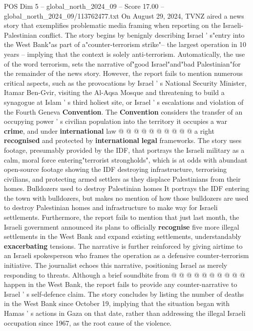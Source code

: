 \begin{textsample}{POS Dim 5 – global\_north\_2024\_09 – Score 17.00 – global\_north\_2024\_09/113762477.txt}
On August 29, 2024, TVNZ aired a news story that exemplifies problematic media framing when reporting on the Israeli-Palestinian conflict.
The story begins by benignly describing Israel ' s"entry into the West Bank"as part of a"counter-terrorism strike"-- the largest operation in 10 years -- implying that the context is solely anti-terrorism.
Automatically, the use of the word terrorism, sets the narrative of"good Israel"and"bad Palestinian"for the remainder of the news story.
However, the report fails to mention numerous critical aspects, such as the provocations by Israel ' s National Security Minister, Itamar Ben-Gvir, visiting the Al-Aqsa Mosque and threatening to build a synagogue at Islam ' s third holiest site, or Israel ' s escalations and violation of the Fourth Geneva \textbf{Convention}.
The \textbf{Convention} considers the transfer of an occupying power ' s civilian population into the territory it occupies a war \textbf{crime}, and under \textbf{international} law @ @ @ @ @ @ @ @ @ @ a right \textbf{recognised} and protected by \textbf{international} \textbf{legal} frameworks.
The story uses footage, presumably provided by the IDF, that portrays the Israeli military as a calm, moral force entering"terrorist strongholds", which is at odds with abundant open-source footage showing the IDF destroying infrastructure, terrorising civilians, and protecting armed settlers as they displace Palestinians from their homes.
Bulldozers used to destroy Palestinian homes It portrays the IDF entering the town with bulldozers, but makes no mention of how those bulldozers are used to destroy Palestinian homes and infrastructure to make way for Israeli settlements.
Furthermore, the report fails to mention that just last month, the Israeli government announced its plans to officially \textbf{recognise} five more illegal settlements in the West Bank and expand existing settlements, understandably \textbf{exacerbating} tensions.
The narrative is further reinforced by giving airtime to an Israeli spokesperson who frames the operation as a defensive counter-terrorism initiative.
The journalist echoes this narrative, positioning Israel as merely responding to threats.
Although a brief soundbite from @ @ @ @ @ @ @ @ @ @ happen in the West Bank, the report fails to provide any counter-narrative to Israel ' s self-defence claim.
The story concludes by listing the number of deaths in the West Bank since October 19, implying that the situation began with Hamas ' s actions in Gaza on that date, rather than addressing the illegal Israeli occupation since 1967, as the root cause of the violence.

\end{textsample}
